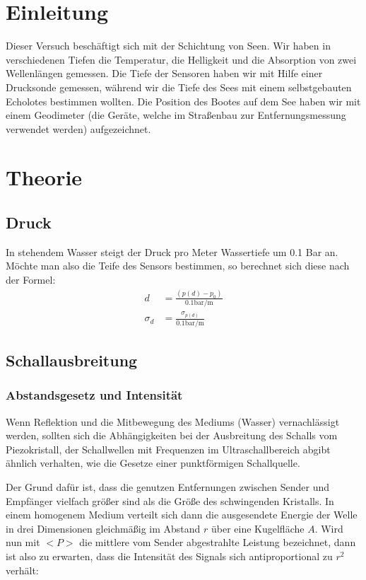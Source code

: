 \documentclass[12pt,a4paper,titlepage,headinclude,bibtotoc]{scrartcl}
\begin{document}
\newpage

\section{Einleitung}
\label{sec:einleitung}
\cite{demtroeder}
Dieser Versuch beschäftigt sich mit der Schichtung von Seen.
Wir haben in verschiedenen Tiefen die Temperatur, die Helligkeit und die Absorption von zwei Wellenlängen gemessen.
Die Tiefe der Sensoren haben wir mit Hilfe einer Drucksonde gemessen, während wir die Tiefe des Sees mit einem selbstgebauten Echolotes bestimmen wollten.
Die Position des Bootes auf dem See haben wir mit einem Geodimeter (die Geräte, welche im Straßenbau zur Entfernungsmessung verwendet werden) aufgezeichnet.


\section{Theorie}
\label{sec:theorie}
\subsection{Druck}
In stehendem Wasser steigt der Druck pro Meter Wassertiefe um 0.1 Bar an.
Möchte man also die Teife des Sensors bestimmen, so berechnet sich diese nach der Formel:
\begin{align}
	d&=\frac{(p(d)-p_0)}{0.1\si{\bar \per\metre}} \label{eq:d}\\
	\sigma_d &= \frac{\sigma_{p(d)}}{0.1\si{\bar \per\metre}}
\end{align}


\subsection{Schallausbreitung}

\subsubsection{Abstandsgesetz und Intensität}

Wenn Reflektion und die Mitbewegung des Mediums (Wasser) vernachlässigt werden, sollten sich die Abhängigkeiten bei der Ausbreitung des Schalls vom Piezokristall, der Schallwellen mit Frequenzen im Ultraschallbereich abgibt
ähnlich verhalten, wie die Gesetze einer punktförmigen Schallquelle. 


Der Grund dafür ist, dass die genutzen Entfernungen zwischen Sender und Empfänger vielfach größer sind als die Größe des schwingenden Kristalls. 
In einem homogenem Medium verteilt sich dann die ausgesendete Energie der Welle in drei Dimensionen gleichmäßig im Abstand $r$ über eine Kugelfläche $A$. Wird nun mit $<P>$ die mittlere vom Sender abgestrahlte Leistung 
bezeichnet, dann ist also zu erwarten, dass die Intensität des Signals sich antiproportional zu $r^2$ verhält:
\end{document}
